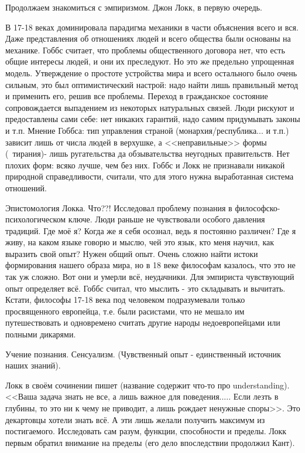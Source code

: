 Продолжаем знакомиться с эмпиризмом.
Джон Локк, в первую очередь.

В 17-18 веках доминировала парадигма механики в части объяснения всего и вся. Даже представления об отношениях людей и всего общества были основаны на механике. Гоббс считает, что проблемы общественного договора нет, что есть общие интересы людей, и они их преследуют. Но это же предельно упрощенная модель. Утверждение о простоте устройства мира и всего остального было очень сильным, это был оптимистический настрой: надо найти лишь правильный метод и применить его, решив все проблемы.
Переход в гражданское состояние сопровождается выпадением из некоторых натуральных связей. Люди рискуют и предоставлены сами себе: нет никаких гарантий, надо самим придумывать законы и т.п.
Мнение Гоббса: тип управления страной (монархия/республика... и т.п.) зависит лишь от числа людей в верхушке, а <<неправильные>> формы (~тирания)- лишь ругательства да обзывательства неугодных правительств. Нет плохих форм: всяко лучше, чем без них.
Гоббс и Локк не признавали никакой природной справедливости, считали, что для этого нужна выработанная система отношений.

Эпистомология Локка. Что??!
Исследовал проблему познания в философско-психологическом ключе. Люди раньше не чувствовали особого давления традиций. Где моё я? Когда же я себя осознал, ведь я постоянно различен? Где я живу, на каком языке говорю и мыслю, чей это язык, кто меня научил, как выразить свой опыт? Нужен общий опыт. Очень сложно найти истоки формирования нашего образа мира, но в 18 веке философам казалось, что это не так уж сложно. Вот они и умерли всё, неудачники. Для эмпириста чувствующий опыт определяет всё. Гоббс считал, что мыслить - это складывать и вычитать. Кстати, философы 17-18 века под человеком подразумевали только просвященного европейца, т.е. были расистами, что не мешало им путешествовать и одновремено считать другие народы недоевропейцами или полными дикарями.

Учение познания. Сенсуализм. (Чувственный опыт - единственный источник наших знаний).

Локк в своём сочинении пишет (название содержит что-то про understanding). <<Ваша задача знать не все, а лишь важное для поведения..... Если лезть в глубины, то это ни к чему не приводит, а лишь рождает ненужные споры>>. Это декартовцы хотели знать всё. А эти лишь желали получить максимум из постигаемого. Исследовать сам разум, функции, способности и пределы. Локк первым обратил внимание на пределы (его дело впоследствии продолжил Кант).

